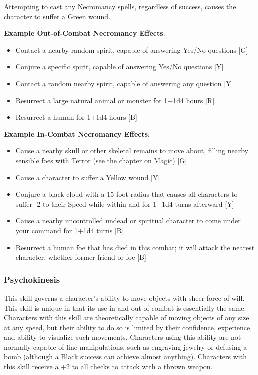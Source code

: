 \documentclass[oneside]{book}
\begin{document}
\begin{multicols}{2}
Attempting to cast any Necromancy spells, regardless of success, causes the character to suffer a Green wound.

\textbf{Example Out-of-Combat Necromancy Effects}:
	\begin{itemize}
		\setlength{\itemsep}{0cm}%
  		\setlength{\parskip}{0cm}%
		\item{ \small Contact a nearby random spirit, capable of answering Yes/No questions  [G]}
		\item{ \small Conjure a specific spirit, capable of answering Yes/No questions [Y]}
		\item{ \small Contact a random nearby spirit, capable of answering any question [Y]}
		\item{ \small Resurrect a large natural animal or monster for 1+1d4 hours [R]}
		\item{ \small Resurrect a human for 1+1d4 hours [B]}
	\end{itemize}
	
\textbf{Example In-Combat Necromancy Effects}:
	\begin{itemize}
		\setlength{\itemsep}{0cm}%
  		\setlength{\parskip}{0cm}%
		\item{ \small Cause a nearby skull or other skeletal remains to move about, filling nearby sensible foes with Terror (see the chapter on Magic)  [G]}
		\item{ \small Cause a character to suffer a Yellow wound  [Y]}
		\item{ \small Conjure a black cloud with a 15-foot radius that causes all characters to suffer -2 to their Speed while within and for 1+1d4 turns afterward [Y]}
		\item{ \small Cause a nearby uncontrolled undead or spiritual character to come under your command for 1+1d4 turns [R]}
		\item{ \small Resurrect a human foe that has died in this combat; it will attack the nearest character, whether former friend or foe [B]}
	\end{itemize}
 
\subsubsection{Psychokinesis}
This skill governs a character's ability to move objects with sheer force of will. This skill is unique in that its use in and out of combat is essentially the same. Characters with this skill are theoretically capable of moving objects of any size at any speed, but their ability to do so is limited by their confidence, experience, and ability to visualize such movements. Characters using this ability are not normally capable of fine manipulations, such as engraving jewelry or defusing a bomb (although a Black success can achieve almost anything). Characters with this skill receive a +2 to all checks to attack with a thrown weapon. 


\end{multicols}
\end{document}
